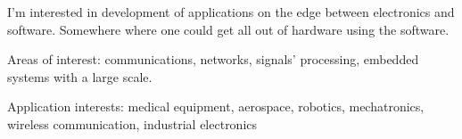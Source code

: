 


\begin{cventries}


\begin{flushleft}

I'm interested in development of applications on the edge between electronics and software. Somewhere where one
could get all out of hardware using the software.
\newline

Areas of interest: communications, networks, signals' processing, embedded systems with a large scale. 
\newline

Application interests: medical equipment, aerospace, robotics, mechatronics, wireless communication, industrial electronics
\end{flushleft}


\end{cventries}